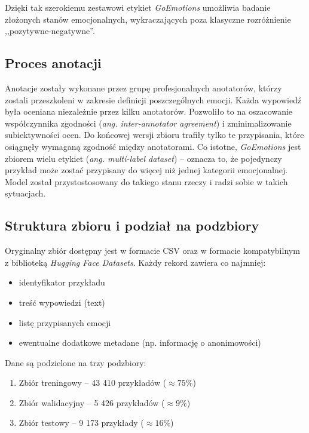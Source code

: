 \documentclass[wmii, inf, mgr]{uwmthesis}
\begin{document}
Dzięki tak szerokiemu zestawowi etykiet \textit{GoEmotions} umożliwia badanie złożonych stanów emocjonalnych, wykraczających poza klasyczne rozróżnienie ,,pozytywne-negatywne''.

\subsection{Proces anotacji}
Anotacje zostały wykonane przez grupę profesjonalnych anotatorów, którzy zostali przeszkoleni w zakresie definicji poszczególnych emocji. Każda wypowiedź była oceniana niezależnie przez kilku anotatorów. Pozwoliło to na oszacowanie współczynnika zgodności (\textit{ang. inter-annotator agreement}) i zminimalizowanie subiektywności ocen. Do końcowej wersji zbioru trafiły tylko te przypisania, które osiągnęły wymaganą zgodność między anotatorami. Co istotne, \textit{GoEmotions} jest zbiorem wielu etykiet (\textit{ang. multi-label dataset}) -- oznacza to, że pojedynczy przykład może zostać przypisany do więcej niż jednej kategorii emocjonalnej. Model został przystostosowany do takiego stanu rzeczy i radzi sobie w takich sytuacjach. 

\subsection{Struktura zbioru i podział na podzbiory}
Oryginalny zbiór dostępny jest w formacie CSV oraz w formacie kompatybilnym z biblioteką \textit{Hugging Face Datasets}. Każdy rekord zawiera co najmniej:

\begin{itemize}
    \item identyfikator przykładu
    \item treść wypowiedzi (text)
    \item listę przypisanych emocji
    \item ewentualne dodatkowe metadane (np. informację o anonimowości)
\end{itemize}

Dane są podzielone na trzy podzbiory:

\begin{enumerate}
    \item Zbiór treningowy -- 43 410 przykładów ($\approx 75\%$)
    \item Zbiór walidacyjny -- 5 426 przykładów ($\approx 9\%$)
    \item Zbiór testowy -- 9 173 przykłady ($\approx 16\%$)
\end{enumerate}
\end{document}
